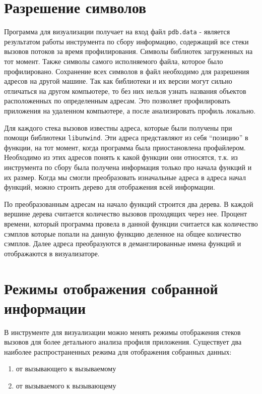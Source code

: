 \section{Разрешение символов}
	Программа для визуализации получает на вход файл \verb|pdb.data| - является результатом работы инструмента по сбору информацию, содержащий все стеки вызовов потоков за время профилирования. Символы библиотек загруженных на тот момент. Также символы самого исполняемого файла, которое было профилировано. Сохранение всех символов в файл необходимо для разрешения адресов на другой машине. Так как библиотеки и их версии могут сильно отличаться на другом компьютере, то без них нельзя узнать названия объектов расположенных по определенным адресам. Это позволяет профилировать приложения на удаленном компьютере, а после анализировать профиль локально. 
    
    Для каждого стека вызовов известны адреса, которые были получены при помощи библиотеки \verb|libunwind|. Эти адреса представляют из себя \enquote{позицию} в функции, на тот момент, когда программа была приостановлена профайлером. Необходимо из этих адресов понять к какой функции они относятся, т.к. из инструмента по сбору была получена информация только про начала функций и их размер. Когда мы смогли преобразовать изначальные адреса в адреса начал функций, можно строить дерево для отображения всей информации.
    
    По преобразованным адресам на начало функций строится два дерева. В каждой вершине дерева считается количество вызовов проходящих через нее. Процент времени, который программа провела в данной функции считается как количество сэмплов которые попали на данную функцию деленное на общее количество сэмплов. Далее адреса преобразуются в деманглированные имена функций и отображаются в визуализаторе.

\section{Режимы отображения собранной информации}
	В инструменте для визуализации можно менять режимы отображения стеков вызовов для более детального анализа профиля приложения. Существует два наиболее распространенных режима для отображения собранных данных:
    \begin{enumerate}
    	\item от вызывающего к вызываемому
        \item от вызываемого к вызывающему
    \end{enumerate}
    
